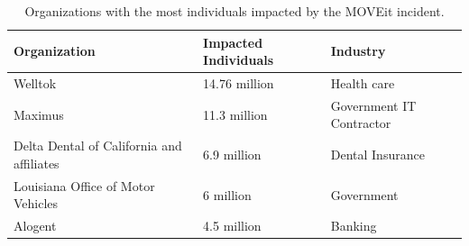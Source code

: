 ﻿\begin{table}[htbp]
    \centering
    \renewcommand{\arraystretch}{1.3}
    \caption{Organizations with the most individuals impacted by the MOVEit incident.}
    \label{tab:moveit_impact}
    \begin{tabularx}{\textwidth}{>{\raggedright\arraybackslash}X l >{\raggedright\arraybackslash}p{4.5cm}}
        \toprule
        \textbf{Organization} & \textbf{Impacted Individuals} & \textbf{Industry} \\
        \midrule
        Welltok & 14.76 million & Health care \\
        \arrayrulecolor{gray!40}\midrule\arrayrulecolor{black}
        Maximus & 11.3 million & Government IT Contractor \\
        \arrayrulecolor{gray!40}\midrule\arrayrulecolor{black}
        Delta Dental of California and affiliates & 6.9 million & Dental Insurance \\
        \arrayrulecolor{gray!40}\midrule\arrayrulecolor{black}
        Louisiana Office of Motor Vehicles & 6 million & Government \\
        \arrayrulecolor{gray!40}\midrule\arrayrulecolor{black}
        Alogent & 4.5 million & Banking \\
        \bottomrule
    \end{tabularx}
\end{table}
